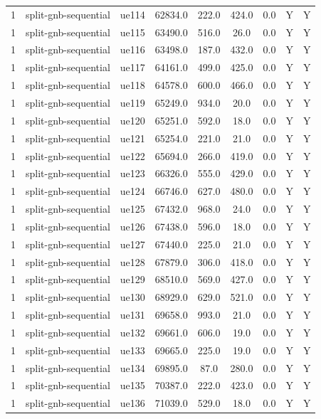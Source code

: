 \begin{table}[ht]
\begin{tabular}{|c|c|c|c|c|c|c|c|c|}
1 & split-gnb-sequential & ue114 & 62834.0 & 222.0 & 424.0 & 0.0 & Y & Y \\
1 & split-gnb-sequential & ue115 & 63490.0 & 516.0 & 26.0 & 0.0 & Y & Y \\
1 & split-gnb-sequential & ue116 & 63498.0 & 187.0 & 432.0 & 0.0 & Y & Y \\
1 & split-gnb-sequential & ue117 & 64161.0 & 499.0 & 425.0 & 0.0 & Y & Y \\
1 & split-gnb-sequential & ue118 & 64578.0 & 600.0 & 466.0 & 0.0 & Y & Y \\
1 & split-gnb-sequential & ue119 & 65249.0 & 934.0 & 20.0 & 0.0 & Y & Y \\
1 & split-gnb-sequential & ue120 & 65251.0 & 592.0 & 18.0 & 0.0 & Y & Y \\
1 & split-gnb-sequential & ue121 & 65254.0 & 221.0 & 21.0 & 0.0 & Y & Y \\
1 & split-gnb-sequential & ue122 & 65694.0 & 266.0 & 419.0 & 0.0 & Y & Y \\
1 & split-gnb-sequential & ue123 & 66326.0 & 555.0 & 429.0 & 0.0 & Y & Y \\
1 & split-gnb-sequential & ue124 & 66746.0 & 627.0 & 480.0 & 0.0 & Y & Y \\
1 & split-gnb-sequential & ue125 & 67432.0 & 968.0 & 24.0 & 0.0 & Y & Y \\
1 & split-gnb-sequential & ue126 & 67438.0 & 596.0 & 18.0 & 0.0 & Y & Y \\
1 & split-gnb-sequential & ue127 & 67440.0 & 225.0 & 21.0 & 0.0 & Y & Y \\
1 & split-gnb-sequential & ue128 & 67879.0 & 306.0 & 418.0 & 0.0 & Y & Y \\
1 & split-gnb-sequential & ue129 & 68510.0 & 569.0 & 427.0 & 0.0 & Y & Y \\
1 & split-gnb-sequential & ue130 & 68929.0 & 629.0 & 521.0 & 0.0 & Y & Y \\
1 & split-gnb-sequential & ue131 & 69658.0 & 993.0 & 21.0 & 0.0 & Y & Y \\
1 & split-gnb-sequential & ue132 & 69661.0 & 606.0 & 19.0 & 0.0 & Y & Y \\
1 & split-gnb-sequential & ue133 & 69665.0 & 225.0 & 19.0 & 0.0 & Y & Y \\
1 & split-gnb-sequential & ue134 & 69895.0 & 87.0 & 280.0 & 0.0 & Y & Y \\
1 & split-gnb-sequential & ue135 & 70387.0 & 222.0 & 423.0 & 0.0 & Y & Y \\
1 & split-gnb-sequential & ue136 & 71039.0 & 529.0 & 18.0 & 0.0 & Y & Y \\

\end{tabular}
\end{table}
